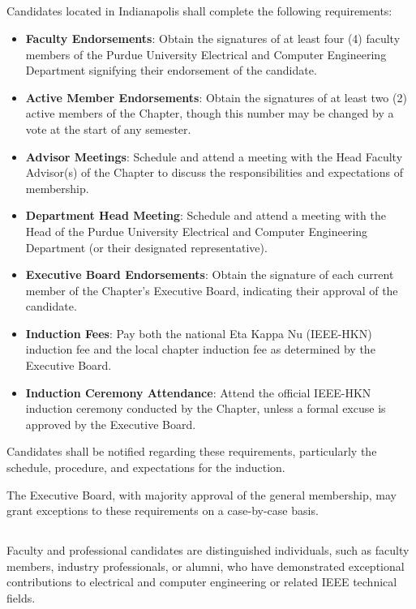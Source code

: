\documentclass[10pt, oneside]{article}
\begin{document}
\subsection{ }
Candidates located in Indianapolis shall complete the following requirements:
\begin{itemize}
    \item \textbf{Faculty Endorsements}: Obtain the signatures of at least four (4) faculty members of the Purdue University Electrical and Computer Engineering Department signifying their endorsement of the candidate.
    \item \textbf{Active Member Endorsements}: Obtain the signatures of at least two (2) active members of the Chapter, though this number may be changed by a vote at the start of any semester.
    \item \textbf{Advisor Meetings}: Schedule and attend a meeting with the Head Faculty Advisor(s) of the Chapter to discuss the responsibilities and expectations of membership.
    \item \textbf{Department Head Meeting}: Schedule and attend a meeting with the Head of the Purdue University Electrical and Computer Engineering Department (or their designated representative).
    \item \textbf{Executive Board Endorsements}: Obtain the signature of each current member of the Chapter's Executive Board, indicating their approval of the candidate.
    \item \textbf{Induction Fees}: Pay both the national Eta Kappa Nu (IEEE-HKN) induction fee and the local chapter induction fee as determined by the Executive Board.
    \item \textbf{Induction Ceremony Attendance}: Attend the official IEEE-HKN induction ceremony conducted by the Chapter, unless a formal excuse is approved by the Executive Board.
\end{itemize}
Candidates shall be notified regarding these requirements, particularly the schedule, procedure, and expectations for the induction.

The Executive Board, with majority approval of the general membership, may grant exceptions to these requirements on a case-by-case basis.

\subsection{}

Faculty and professional candidates are distinguished individuals, such as faculty members, industry professionals, or alumni, who have demonstrated exceptional contributions to electrical and computer engineering or related IEEE technical fields.
\end{document}
